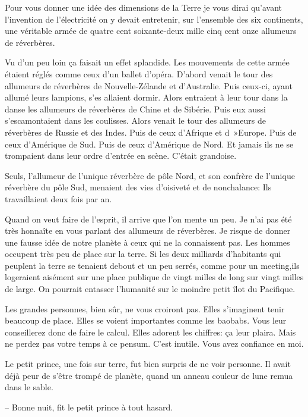 \documentclass[a4paper]{report}
\begin{document}
Pour vous donner une idée des dimensions de la Terre je vous dirai qu'avant l'invention de l'électricité on y devait entretenir, sur l'ensemble des six continents, une véritable armée de quatre cent soixante-deux mille cinq cent onze allumeurs de réverbères.

Vu d'un peu loin ça faisait un effet splandide. Les mouvements de cette armée étaient réglés comme ceux d'un ballet d'opéra. D'abord venait le tour des allumeurs de réverbères de Nouvelle-Zélande et d'Australie. Puis ceux-ci, ayant allumé leurs lampions, s'es allaient dormir. Alors entraient à leur tour dans la danse les allumeurs de réverbères de Chine et de Sibérie. Puis eux aussi s'escamontaient dans les coulisses. Alors venait le tour des allumeurs de réverbères de Russie et des Indes. Puis de ceux d'Afrique et d~»Europe. Puis de ceux d'Amérique de Sud. Puis de ceux d'Amérique de Nord. Et jamais ils ne se trompaient dans leur ordre d'entrée en scène. C'était grandoise.

Seuls, l'allumeur de l'unique réverbère de pôle Nord, et son confrère de l'unique réverbère du pôle Sud, menaient des vies d'oisiveté et de nonchalance: Ils travaillaient deux fois par an.


\parachapter{} %
Quand on veut faire de l'esprit, il arrive que l'on mente un peu. Je n'ai pas été très honnaîte en vous parlant des allumeurs de réverbères. Je risque de donner une fausse idée de notre planète à ceux qui ne la connaissent pas. Les hommes occupent très peu de place sur la terre. Si les deux milliards d'habitants qui peuplent la terre se tenaient debout et un peu serrés, comme pour un meeting,ils logeraient aisément sur une place publique de vingt milles de long sur vingt milles de large. On pourrait entasser l'humanité sur le moindre petit îlot du Pacifique.

Les grandes personnes, bien sûr, ne vous croiront pas. Elles s'imaginent tenir beaucoup de place. Elles se voient importantes comme les baobabs. Vous leur conseillerez donc de faire le calcul. Elles adorent les chiffres: ça leur plaira. Mais ne perdez pas votre temps à ce pensum. C'est inutile. Vous avez confiance en moi.

Le petit prince, une fois sur terre, fut bien surpris de ne voir personne. Il avait déjà peur de s'être trompé de planète, quand un anneau couleur de lune remua dans le sable.

-- Bonne nuit, fit le petit prince à tout hasard.
\end{document}
